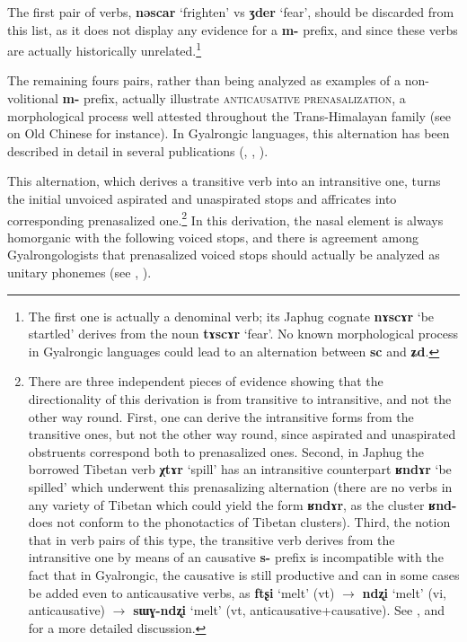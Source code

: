 \documentclass[oneside,a4paper,11pt]{article}
\newcommand{\ipa}[1]{\textbf{{\phon\mbox{#1}}}} %
\begin{document}
 The first pair of verbs, \ipa{nəscar} `frighten' vs \ipa{ʒder} `fear', should be discarded from this list, as it does not display any evidence for a \ipa{m-} prefix, and since these verbs are actually historically unrelated.\footnote{The first one is actually a denominal verb; its Japhug cognate \ipa{nɤscɤr} `be startled' derives from the noun \ipa{tɤscɤr} `fear'. No known morphological process in Gyalrongic languages could lead to an alternation between \ipa{sc} and \ipa{ʑd}.}

The remaining fours pairs, rather than being analyzed as examples of a non-volitional \ipa{m-} prefix, actually illustrate \textsc{anticausative prenasalization}, a morphological process well attested throughout the Trans-Himalayan family (see \citealt{sagart03prenasalized} on Old Chinese for instance). In Gyalrongic languages, this alternation has been described in detail in several publications (\citealt{lai13affixale}, \citealt{jacques15spontaneous}, \citealt{jacques15causative}). 

This alternation, which derives a transitive verb into an intransitive one, turns the initial unvoiced aspirated and unaspirated stops and affricates into corresponding prenasalized one.\footnote{There are three independent pieces of evidence showing that the directionality of this derivation is from transitive to intransitive, and not the other way round. First, one can derive the intransitive forms from the transitive ones, but not the other way round, since aspirated and unaspirated obstruents correspond both to prenasalized ones. Second, in Japhug the borrowed Tibetan verb \ipa{χtɤr} `spill' has an intransitive counterpart \ipa{ʁndɤr} `be spilled' which underwent this prenasalizing alternation (there are no verbs in any variety of Tibetan which could yield the form \ipa{ʁndɤr}, as the cluster \ipa{ʁnd-} does not conform to the phonotactics of Tibetan clusters). Third, the notion that in verb pairs of this type, the transitive verb derives from the intransitive one by means of an causative \ipa{s-} prefix is incompatible with the fact that in Gyalrongic, the causative is still productive and can in some cases be added even to anticausative verbs, as \ipa{ftʂi} `melt' (vt) $\rightarrow$ \ipa{ndʐi} `melt' (vi, anticausative) $\rightarrow$ \ipa{sɯɣ-ndʐi} `melt' (vt, anticausative+causative). See \citealt{jacques15spontaneous}, \citealt{jacques15causative} and \citealt{gong17xingtaixue} for a more detailed discussion. } In this derivation, the nasal element is always homorganic with the following voiced stops, and there is agreement among Gyalrongologists that prenasalized voiced stops should actually be analyzed as unitary phonemes (see \citealt{jackson03caodeng}, \citealt[8-9]{jacques08}).
\end{document}
